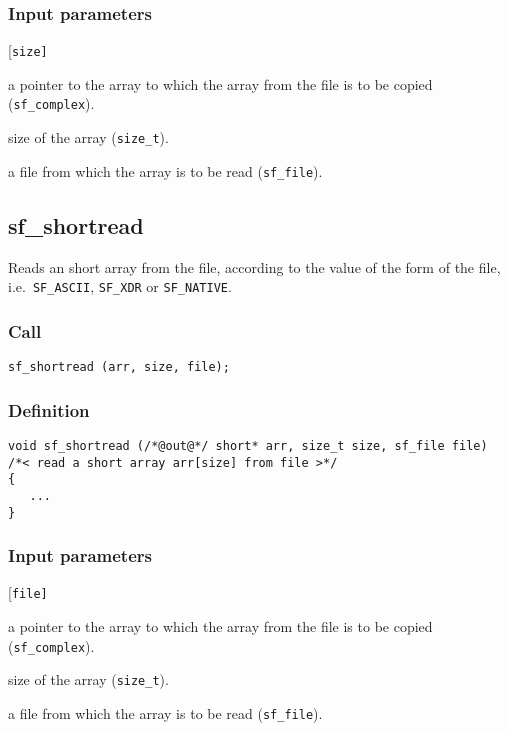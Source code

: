 \subsubsection*{Input parameters}
\begin{desclist}{\tt }{\quad}[\tt size]
   \setlength\itemsep{0pt}
   \item[arr]  a pointer to the array to which the array from the file is to be copied (\texttt{sf\_complex}). 
   \item[size] size of the array (\texttt{size\_t}). 
   \item[file] a file from which the array is to be read (\texttt{sf\_file}).
\end{desclist}




\subsection{{sf\_shortread}}
Reads an short array from the file, according to the value of the form of the file, i.e.~\texttt{SF\_ASCII}, \texttt{SF\_XDR} or \texttt{SF\_NATIVE}.        

\subsubsection*{Call}
\begin{verbatim}sf_shortread (arr, size, file);\end{verbatim}

\subsubsection*{Definition}
\begin{verbatim}
void sf_shortread (/*@out@*/ short* arr, size_t size, sf_file file)
/*< read a short array arr[size] from file >*/
{
   ...
}
\end{verbatim}

\subsubsection*{Input parameters}
\begin{desclist}{\tt }{\quad}[\tt file]
   \setlength\itemsep{0pt}
   \item[arr ] a pointer to the array to which the array from the file is to be copied (\texttt{sf\_complex}). 
   \item[size] size of the array (\texttt{size\_t}). 
   \item[file] a file from which the array is to be read (\texttt{sf\_file}).
\end{desclist}




